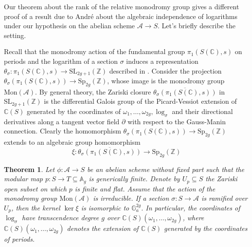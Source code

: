 \documentclass[10 pt,a4paper]{article}
\theoremstyle{plain}
\newtheorem{thm}{Theorem}[section]
\theoremstyle{definition}
\theoremstyle{named}
\newcommand{\cA}{\mathcal A}
\newcommand{\bC}{\mathbb C}
\newcommand{\bZ}{\mathbb Z}
\begin{document}
Our theorem about the rank of the relative monodromy group  gives a different proof of a result due to André \cite[Theorem 3]{André} about the algebraic independence of logarithms under our hypothesis on the abelian scheme $\cA \to S$. Let's briefly describe the setting.

Recall that the monodromy action of the fundamental group $\pi_1(S(\bC),s)$ on periods and the logarithm of a section $\sigma$ induces a representation $\theta_\sigma: \pi_1(S(\bC),s) \rightarrow \textrm{SL}_{2g+1}(\bZ)$ described in . Consider the projection $\theta_\sigma(\pi_1(S(\bC),s)) \to \textrm{Sp}_{2g}(\bZ)$, whose image is the monodromy group $\textrm{Mon}(\cA)$. By general theory, the Zariski closure $\overline{\theta_\sigma(\pi_1(S(\bC),s))}$ in $\textrm{SL}_{2g+1}(\mathbb Z)$ is the differential Galois group of the Picard-Vessiot extension of $\bC(S)$ generated by the coordinates of $\omega_1, \ldots, \omega_{2g}, \log_\sigma$ and their directional derivatives along a tangent vector field $\partial$ with respect to the Gauss-Manin connection. Clearly the homomorphism $\theta_\sigma(\pi_1(S(\bC),s)) \to \textrm{Sp}_{2g}(\bZ)$ extends to an algebraic group homomorphism
\[
\xi: \overline{\theta_\sigma(\pi_1(S(\bC),s))} \to \textrm{Sp}_{2g}(\mathbb Z)
\]

\begin{thm}
    Let $\phi:\cA \to S$ be an abelian scheme without fixed part such that the modular map $p:S \to T \subseteq \mathbb A_g$ is generically finite. Denote by $U_p \subseteq S$ the Zariski open subset on which $p$ is finite and flat. Assume that the action of the monodromy group $\textrm{Mon}(\cA)$ is irreducible. If a section $\sigma:S \to \cA$ is ramified over $U_p$, then the kernel $\ker{\xi}$ is isomorphic to $\mathbb{G}_a^{2g}$. In particular, the coordinates of $\log_\sigma$ have transcendence degree $g$ over $\bC(S)(\omega_1, \ldots, \omega_{2g})$, where $\bC(S)(\omega_1, \ldots, \omega_{2g})$ denotes the extension of $\bC(S)$ generated by the coordinates of periods.
\end{thm}
\end{document}
